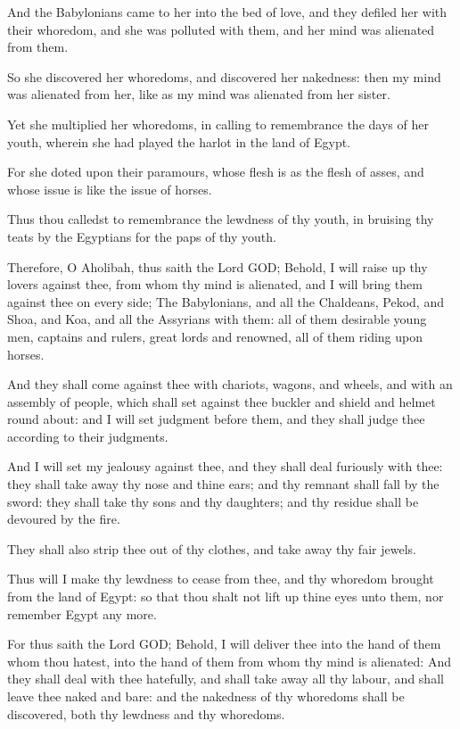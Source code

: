 \Verse And the Babylonians came to her into the bed of love, and they defiled her with their whoredom, and she was polluted with them, and her mind was alienated from them.

\Verse So she discovered her whoredoms, and discovered her nakedness: then my mind was alienated from her, like as my mind was alienated from her sister.

\Verse Yet she multiplied her whoredoms, in calling to remembrance the days of her youth, wherein she had played the harlot in the land of Egypt.

\Verse For she doted upon their paramours, whose flesh is as the flesh of asses, and whose issue is like the issue of horses.

\Verse Thus thou calledst to remembrance the lewdness of thy youth, in bruising thy teats by the Egyptians for the paps of thy youth.

\Verse Therefore, O Aholibah, thus saith the Lord GOD; Behold, I will raise up thy lovers against thee, from whom thy mind is alienated, and I will bring them against thee on every side; \Verse The Babylonians, and all the Chaldeans, Pekod, and Shoa, and Koa, and all the Assyrians with them: all of them desirable young men, captains and rulers, great lords and renowned, all of them riding upon horses.

\Verse And they shall come against thee with chariots, wagons, and wheels, and with an assembly of people, which shall set against thee buckler and shield and helmet round about: and I will set judgment before them, and they shall judge thee according to their judgments.

\Verse And I will set my jealousy against thee, and they shall deal furiously with thee: they shall take away thy nose and thine ears; and thy remnant shall fall by the sword: they shall take thy sons and thy daughters; and thy residue shall be devoured by the fire.

\Verse They shall also strip thee out of thy clothes, and take away thy fair jewels.

\Verse Thus will I make thy lewdness to cease from thee, and thy whoredom brought from the land of Egypt: so that thou shalt not lift up thine eyes unto them, nor remember Egypt any more.

\Verse For thus saith the Lord GOD; Behold, I will deliver thee into the hand of them whom thou hatest, into the hand of them from whom thy mind is alienated: \Verse And they shall deal with thee hatefully, and shall take away all thy labour, and shall leave thee naked and bare: and the nakedness of thy whoredoms shall be discovered, both thy lewdness and thy whoredoms.


